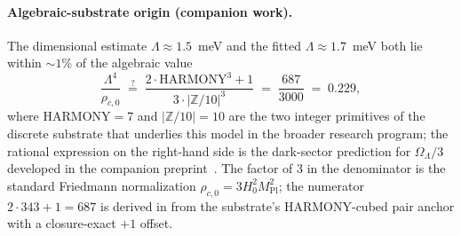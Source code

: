 %
%
%
%
%
%
%
%

\paragraph{Algebraic-substrate origin (companion work).}
The dimensional estimate $\Lambda \approx 1.5$~meV and the
fitted $\Lambda \approx 1.7$~meV both lie within $\sim 1\%$ of the
algebraic value
\begin{equation}\label{eq:Lambda-structural}
  \frac{\Lambda^{4}}{\rho_{c,0}}
  \;\stackrel{?}{=}\;
  \frac{2 \cdot \mathrm{HARMONY}^{3} + 1}{3 \cdot |\mathbb{Z}/10|^{3}}
  \;=\; \frac{687}{3000}
  \;=\; 0.229,
\end{equation}
where $\mathrm{HARMONY} = 7$ and $|\mathbb{Z}/10| = 10$ are the
two integer primitives of the discrete substrate that underlies
this model in the broader research program; the rational
expression on the right-hand side is the dark-sector prediction
for $\Omega_\Lambda/3$ developed in the companion
preprint~\cite{Sprint18Cosmology2026}. The factor of $3$ in the
denominator is the standard Friedmann normalization
$\rho_{c,0} = 3 H_{0}^{2} M_\mathrm{Pl}^{2}$; the numerator
$2 \cdot 343 + 1 = 687$ is derived in
\cite{Sprint18Cosmology2026} from the substrate's
HARMONY-cubed pair anchor with a closure-exact $+1$ offset.

